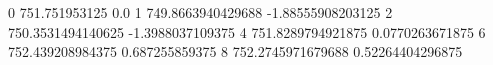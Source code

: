 0 751.751953125 0.0
1 749.8663940429688 -1.88555908203125
2 750.3531494140625 -1.3988037109375
4 751.8289794921875 0.0770263671875
6 752.439208984375 0.687255859375
8 752.2745971679688 0.52264404296875
